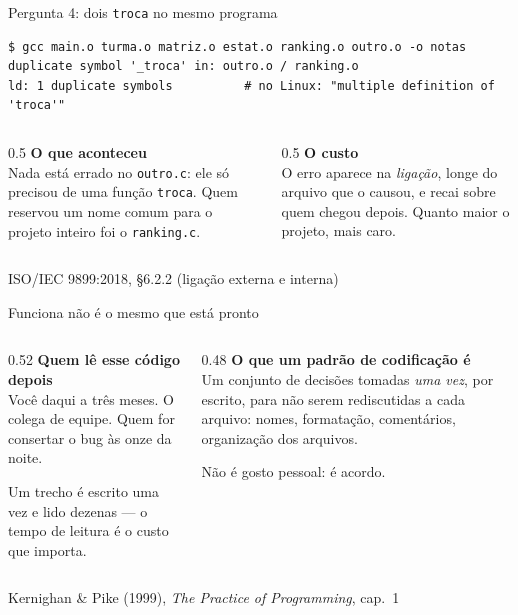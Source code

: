 \documentclass[aspectratio=169]{beamer}
\newcommand{\fonte}[1]{\vfill\hfill{\scriptsize\textcolor{UFSGray}{#1}}}
\begin{document}
\begin{frame}[fragile]{Pergunta 4: dois \texttt{troca} no mesmo programa}
\begin{lstlisting}[style=shellStyle]
$ gcc main.o turma.o matriz.o estat.o ranking.o outro.o -o notas
duplicate symbol '_troca' in: outro.o / ranking.o
ld: 1 duplicate symbols          # no Linux: "multiple definition of 'troca'"
\end{lstlisting}
  \begin{columns}[T]
    \begin{column}{0.5\textwidth}
      \small \textbf{O que aconteceu}\\
      Nada está errado no \texttt{outro.c}: ele só precisou de uma função
      \texttt{troca}. Quem reservou um nome comum para o projeto inteiro foi
      o \texttt{ranking.c}.
    \end{column}
    \begin{column}{0.5\textwidth}
      \small \textbf{O custo}\\
      O erro aparece na \emph{ligação}, longe do arquivo que o causou, e
      recai sobre quem chegou depois. Quanto maior o projeto, mais caro.
    \end{column}
  \end{columns}
  \fonte{ISO/IEC 9899:2018, §6.2.2 (ligação externa e interna)~\cite{iso2018c17}}
\end{frame}

\begin{frame}{Funciona não é o mesmo que está pronto}
  \begin{columns}[T]
    \begin{column}{0.52\textwidth}
      \textbf{Quem lê esse código depois}\\[0.3em]
      Você daqui a três meses. O colega de equipe. Quem for consertar o bug
      às onze da noite.

      \medskip
      Um trecho é escrito uma vez e lido dezenas --- o tempo de leitura é o
      custo que importa.
    \end{column}
    \begin{column}{0.48\textwidth}
      \textbf{O que um padrão de codificação é}\\[0.3em]
      Um conjunto de decisões tomadas \emph{uma vez}, por escrito, para não
      serem rediscutidas a cada arquivo: nomes, formatação, comentários,
      organização dos arquivos.

      \medskip
      Não é gosto pessoal: é acordo.
    \end{column}
  \end{columns}
  \fonte{Kernighan \& Pike (1999), \emph{The Practice of Programming}, cap.~1~\cite{kernighan1999practice}}
\end{frame}
\end{document}

